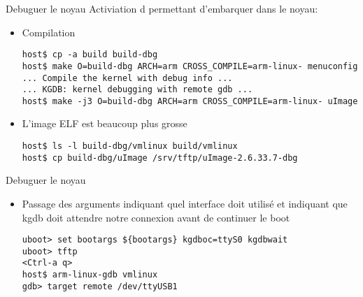 
\begin{frame}[fragile=singleslide]{Debuguer le noyau}
  Activiation d  permettant d'embarquer  dans
  le noyau:
  \begin{itemize}
  \item Compilation
    \begin{lstlisting}
host$ cp -a build build-dbg
host$ make O=build-dbg ARCH=arm CROSS_COMPILE=arm-linux- menuconfig
... Compile the kernel with debug info ...
... KGDB: kernel debugging with remote gdb ...
host$ make -j3 O=build-dbg ARCH=arm CROSS_COMPILE=arm-linux- uImage
    \end{lstlisting}
  \item L'image ELF est beaucoup plus grosse
    \begin{lstlisting}
host$ ls -l build-dbg/vmlinux build/vmlinux
host$ cp build-dbg/uImage /srv/tftp/uImage-2.6.33.7-dbg
    \end{lstlisting}
  \end{itemize}
\end{frame}

\begin{frame}[fragile=singleslide]{Debuguer le noyau}
  \begin{itemize}
  \item  Passage des arguments   indiquant  quel interface
     doit utilisé et   indiquant que kgdb doit
    attendre notre connexion avant de continuer le boot
    \begin{lstlisting}
uboot> set bootargs ${bootargs} kgdboc=ttyS0 kgdbwait
uboot> tftp
<Ctrl-a q>
host$ arm-linux-gdb vmlinux
gdb> target remote /dev/ttyUSB1
    \end{lstlisting}
  \end{itemize}
\end{frame}

